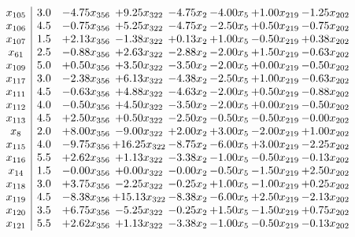 \documentclass[8pt]{article}
\begin{document}
\[\begin{array}{c| c c@{\hskip 2pt} c@{\hskip 2pt} c@{\hskip 2pt} c@{\hskip 2pt} c@{\hskip 2pt} c@{\hskip 2pt} }
 x_{105}   &  3.0 & -4.75 x_{356} & +  9.25 x_{322} & -4.75 x_{2} & -4.00 x_{5} & +  1.00 x_{219} & -1.25 x_{202}\\
 x_{106}   &  4.5 & -0.75 x_{356} & +  5.25 x_{322} & -4.75 x_{2} & -2.50 x_{5} & +  0.50 x_{219} & -0.75 x_{202}\\
 x_{107}   &  1.5 & +  2.13 x_{356} & -1.38 x_{322} & +  0.13 x_{2} & +  1.00 x_{5} & -0.50 x_{219} & +  0.38 x_{202}\\
 x_{61}   &  2.5 & -0.88 x_{356} & +  2.63 x_{322} & -2.88 x_{2} & -2.00 x_{5} & +  1.50 x_{219} & -0.63 x_{202}\\
 x_{109}   &  5.0 & +  0.50 x_{356} & +  3.50 x_{322} & -3.50 x_{2} & -2.00 x_{5} & +  0.00 x_{219} & -0.50 x_{202}\\
 x_{117}   &  3.0 & -2.38 x_{356} & +  6.13 x_{322} & -4.38 x_{2} & -2.50 x_{5} & +  1.00 x_{219} & -0.63 x_{202}\\
 x_{111}   &  4.5 & -0.63 x_{356} & +  4.88 x_{322} & -4.63 x_{2} & -2.00 x_{5} & +  0.50 x_{219} & -0.88 x_{202}\\
 x_{112}   &  4.0 & -0.50 x_{356} & +  4.50 x_{322} & -3.50 x_{2} & -2.00 x_{5} & +  0.00 x_{219} & -0.50 x_{202}\\
 x_{113}   &  4.5 & +  2.50 x_{356} & +  0.50 x_{322} & -2.50 x_{2} & -0.50 x_{5} & -0.50 x_{219} & -0.00 x_{202}\\
 x_{8}   &  2.0 & +  8.00 x_{356} & -9.00 x_{322} & +  2.00 x_{2} & +  3.00 x_{5} & -2.00 x_{219} & +  1.00 x_{202}\\
 x_{115}   &  4.0 & -9.75 x_{356} & + 16.25 x_{322} & -8.75 x_{2} & -6.00 x_{5} & +  3.00 x_{219} & -2.25 x_{202}\\
 x_{116}   &  5.5 & +  2.62 x_{356} & +  1.13 x_{322} & -3.38 x_{2} & -1.00 x_{5} & -0.50 x_{219} & -0.13 x_{202}\\
 x_{14}   &  1.5 & -0.00 x_{356} & +  0.00 x_{322} & -0.00 x_{2} & -0.50 x_{5} & -1.50 x_{219} & +  2.50 x_{202}\\
 x_{118}   &  3.0 & +  3.75 x_{356} & -2.25 x_{322} & -0.25 x_{2} & +  1.00 x_{5} & -1.00 x_{219} & +  0.25 x_{202}\\
 x_{119}   &  4.5 & -8.38 x_{356} & + 15.13 x_{322} & -8.38 x_{2} & -6.00 x_{5} & +  2.50 x_{219} & -2.13 x_{202}\\
 x_{120}   &  3.5 & +  6.75 x_{356} & -5.25 x_{322} & -0.25 x_{2} & +  1.50 x_{5} & -1.50 x_{219} & +  0.75 x_{202}\\
 x_{121}   &  5.5 & +  2.62 x_{356} & +  1.13 x_{322} & -3.38 x_{2} & -1.00 x_{5} & -0.50 x_{219} & -0.13 x_{202}\\

\end{array}\]
\end{document}
